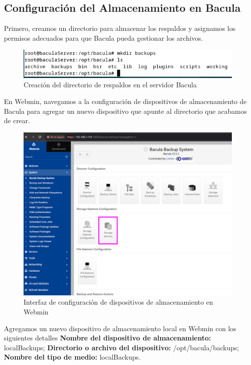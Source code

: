 \subsection{Configuración del Almacenamiento en Bacula}

Primero, creamos un directorio para almacenar los respaldos y asignamos los permisos adecuados para que Bacula pueda gestionar los archivos.

\begin{figure}[H]
    \centering
    \includegraphics[width=0.5\linewidth]{instalacionBacula/mkdirbackups.png}
    \caption{Creación del directorio de respaldos en el servidor Bacula}
\end{figure}

En Webmin, navegamos a la configuración de dispositivos de almacenamiento de Bacula para agregar un nuevo dispositivo que apunte al directorio que acabamos de crear.

\begin{figure}[H]
    \centering
    \includegraphics[width=0.5\linewidth]{instalacionBacula/STO.png}
    \caption{Interfaz de configuración de dispositivos de almacenamiento en Webmin}
\end{figure}

Agregamos un nuevo dispositivo de almacenamiento local en Webmin con los siguientes detalles \textbf{Nombre del dispositivo de almacenamiento:} localBackups; \textbf{Directorio o archivo del dispositivo:} /opt/bacula/backups; \textbf{Nombre del tipo de medio:} localBackups.



